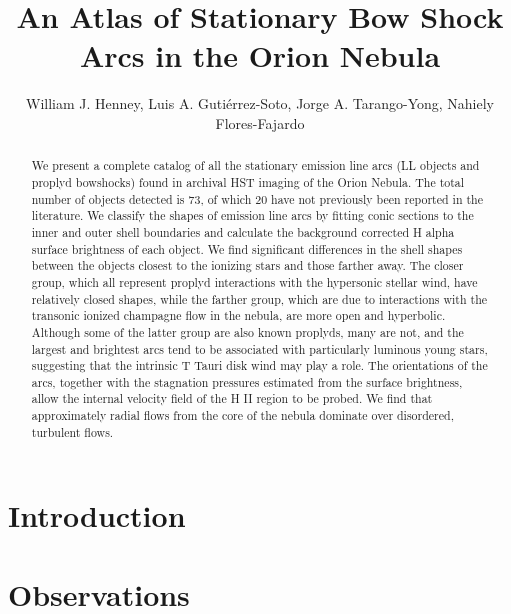 \documentclass[iop, apj]{emulateapj}
\begin{document}
\title{
  An Atlas of Stationary Bow Shock Arcs in the Orion Nebula
}
\author{
  William J. Henney, 
  Luis A. Gutiérrez-Soto,
  Jorge A. Tarango-Yong,
  Nahiely Flores-Fajardo
}


\begin{abstract}
  We present a complete catalog of all the stationary emission line arcs (LL objects and proplyd bowshocks) found in archival HST imaging of the Orion Nebula.   The total number of objects detected is 73, of which 20 have not previously been reported in the literature.  We classify the shapes of emission line arcs by fitting conic sections to the inner and outer shell boundaries and calculate the background corrected H alpha surface brightness of each object.   We find significant differences in the shell shapes between the objects closest to the ionizing stars and those farther away.  The closer group, which all represent proplyd interactions with the hypersonic stellar wind, have relatively closed shapes, while the farther group, which are due to interactions with the transonic ionized champagne flow in the nebula, are more open and hyperbolic.  Although some of the latter group are also known proplyds, many are not, and the largest and brightest arcs tend to be associated with particularly luminous young stars, suggesting that the intrinsic T Tauri disk wind may play a role.  The orientations of the arcs, together with the stagnation pressures estimated from the surface brightness, allow the internal velocity field of the H II region to be probed.  We find that approximately radial flows from the core of the nebula dominate over disordered, turbulent flows.
\end{abstract}

\section{Introduction}
\label{sec:intro}

\section{Observations}
\label{sec:observ}
\end{document}

